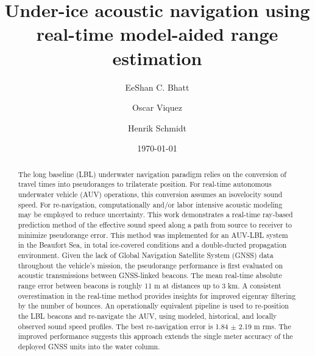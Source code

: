 \documentclass[preprint,TurnOnLineNumbers]{JASA}
\newcommand{\llabel}[1]{\hypertarget{llineno:#1}{\linelabel{#1}}}
\begin{document}
\title[JASA/draft]{Under-ice acoustic navigation using real-time model-aided range estimation}
\author{EeShan C. Bhatt}
\author{Oscar Viquez}
\author{Henrik Schmidt}


\date{\today}

\begin{abstract}
The long baseline (LBL) underwater navigation paradigm relies on the conversion of travel times into pseudoranges to trilaterate position. 
For real-time autonomous underwater vehicle (AUV) operations, this conversion assumes an isovelocity sound speed.
For re-navigation, computationally and/or labor intensive acoustic modeling may be employed to reduce uncertainty.
This work demonstrates a real-time ray-based prediction method of the effective sound speed along a path from source to receiver to minimize pseudorange error.
\llabel{2.1} This method was implemented for an AUV-LBL system in the Beaufort Sea, in total ice-covered conditions and a double-ducted propagation environment.
\llabel{2.2} Given the lack of Global Navigation Satellite System (GNSS) data throughout the vehicle's mission, the pseudorange performance is first evaluated on acoustic transmissions between GNSS-linked beacons.
The mean real-time absolute range error between beacons is roughly 11 m at distances up to 3 km.
A consistent overestimation in the real-time method provides insights for improved eigenray filtering by the number of bounces.
An operationally equivalent pipeline is used to re-position the LBL beacons and re-navigate the AUV, using modeled, historical, and locally observed sound speed profiles.
The best re-navigation error is 1.84 $\pm$ 2.19 m rms.
\llabel{2.3} The improved performance suggests this approach extends the single meter accuracy of the deployed GNSS units into the water column.
\end{abstract}


\maketitle
\end{document}
